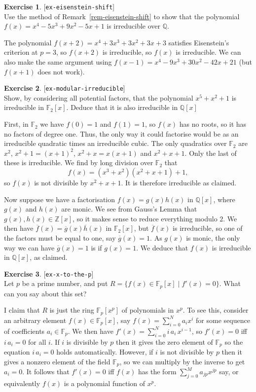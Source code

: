 \documentclass{amsart}
\newcommand{\Z}         {{\mathbb{Z}}}
\newcommand{\Q}         {{\mathbb{Q}}}
\newcommand{\F}         {{\mathbb{F}}}
\newcommand{\ov}[1]     {\overline{#1}}
\newcommand{\st}        {\;|\;}
\renewcommand{\:}{\colon}
\newcommand{\lastexlabel}{}
\newcommand{\exlabel}[1]{
 \global\def\lastexlabel{#1}\label{#1}[\texttt{#1}]\ \\
}
\newcommand{\exlabel}[1]{
 \global\def\lastexlabel{#1}\label{#1}
}
\newenvironment{solution}{\SolutionInline}{\endSolutionInline}
\theoremstyle{definition}
\newtheorem{exercise}{Exercise}[section]
\renewenvironment{solution}{\SolutionAtEnd}{\endSolutionAtEnd}
\begin{document}
\begin{exercise}\exlabel{ex-eisenstein-shift}
 Use the method of Remark~\ref{rem-eisenstein-shift} to show that the
 polynomial $f(x)=x^4-5x^3+9x^2-5x+1$ is irreducible over $\Q$.
\end{exercise}
\begin{solution}
 The polynomial $f(x+2)=x^4+3x^3+3x^2+3x+3$ satisfies Eisenstein's
 criterion at $p=3$, so $f(x+2)$ is irreducible, so $f(x)$ is
 irreducible.  We can also make the same argument using
 $f(x-1)=x^4-9x^3+30x^2-42x+21$ (but $f(x+1)$ does not work).
\end{solution}
\begin{exercise}\exlabel{ex-modular-irreducible}
 Show, by considering all potential factors, that the polynomial
 $x^5+x^2+1$ is irreducible in $\F_2[x]$.  Deduce that it is also
 irreducible in $\Q[x]$
\end{exercise}
\begin{solution}
 First, in $\F_2$ we have $f(0)=1$ and $f(1)=1$, so $f(x)$ has no
 roots, so it has no factors of degree one.  Thus, the only way it
 could factorise would be as an irreducible quadratic times an
 irreducible cubic.  The only quadratics over $\F_2$ are $x^2$,
 $x^2+1=(x+1)^2$, $x^2+x=x(x+1)$ and $x^2+x+1$.  Only the last of
 these is irreducible.  We find by long division over $\F_2$ that 
 \[ f(x) = (x^3+x^2)(x^2+x+1) + 1, \]
 so $f(x)$ is not divisible by $x^2+x+1$.  It is therefore irreducible
 as claimed.  

 Now suppose we have a factorisation $f(x)=g(x)h(x)$ in $\Q[x]$, where
 $g(x)$ and $h(x)$ are monic.  We see from Gauss's Lemma that
 $g(x),h(x)\in\Z[x]$, so it makes sense to reduce everything modulo
 $2$.  We then have $\ov{f}(x)=\ov{g}(x)\ov{h}(x)$ in $\F_2[x]$,
 but $\ov{f}(x)$ is irreducible, so one of the factors must be equal
 to one, say $\ov{g}(x)=1$.  As $g(x)$ is monic, the only way we can
 have $\ov{g}(x)=1$ is if $g(x)=1$.  We deduce that $f(x)$ is
 irreducible in $\Q[x]$, as claimed. 
\end{solution}

\begin{exercise}\exlabel{ex-x-to-the-p}
 Let $p$ be a prime number, and put
 $R=\{f(x)\in \F_p[x]\st f'(x)=0\}$.  What can you say about this set?
\end{exercise}
\begin{solution}
 I claim that $R$ is just the ring $\F_p[x^p]$ of polynomials in
 $x^p$.  To see this, consider an arbitrary element $f(x)\in\F_p[x]$,
 say $f(x)=\sum_{i=0}^Na_ix^i$ for some sequence of coefficients
 $a_i\in\F_p$.  We then have $f'(x)=\sum_{i=0}^N i\,a_i\,x^{i-1}$, so
 $f'(x)=0$ iff $i\,a_i=0$ for all $i$.  If $i$ is divisible by $p$
 then it gives the zero element of $\F_p$ so the equation $i\,a_i=0$
 holds automatically.  However, if $i$ is not divisible by $p$
 then it gives a nonzero element of the field $\F_p$, so we can
 multiply by the inverse to get $a_i=0$.  It follows that $f'(x)=0$
 iff $f(x)$ has the form $\sum_{j=0}^Ma_{jp}x^{jp}$ say, or
 equivalently $f(x)$ is a polynomial function of $x^p$.
\end{solution}
\end{document}
